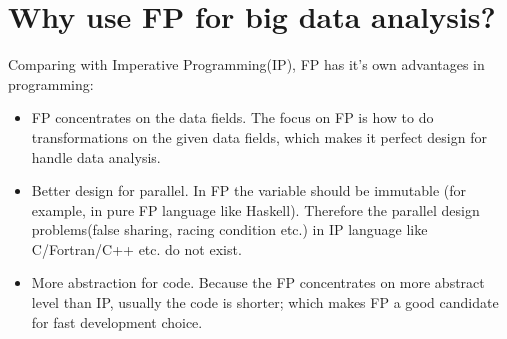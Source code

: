 \documentclass[notheorems, aspectratio=54]{beamer}
\begin{document}
\section{Why use FP for big data analysis?}
\begin{frame}

 Comparing with Imperative Programming(IP), FP has it's own advantages in programming:
 \begin{itemize}
 \item FP concentrates on the data fields. The focus on FP is how to do transformations on the given data fields, which 
 makes it perfect design for handle data analysis.
 \item Better design for parallel. In FP the variable should be immutable (for example, in pure FP language like Haskell).
 Therefore the parallel design problems(false sharing, racing condition etc.) in IP language like C/Fortran/C++ etc. do not 
 exist. 
 \item More abstraction for code. Because the FP concentrates on more abstract level than IP, usually the code is shorter;
 which makes FP a good candidate for fast development choice.
 \end{itemize} 

\end{frame}

\end{document}

